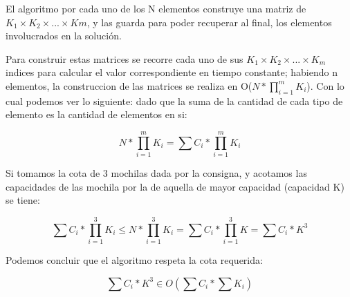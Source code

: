 El algoritmo por cada uno de los N elementos construye una matriz de $K_{1} \times K_{2} \times...\times K{m}$, y las guarda para poder recuperar al final, los elementos involucrados en la solución.

Para construir estas matrices se recorre cada uno de sus $K_{1} \times K_{2} \times...\times K_{m}$ indices para calcular el valor correspondiente en tiempo constante; habiendo n elementos, la construccion de las matrices se realiza en O($N \ast \prod_{i=1}^{m}K_{i}$). Con lo cual podemos ver lo siguiente: dado que la suma de la cantidad de cada tipo de elemento es la cantidad de elementos en si:

\[
N \ast \prod_{i=1}^{m}K_{i} = \sum C_{i} \ast \prod_{i=1}^{m}K_{i}
\]

Si tomamos la cota de 3 mochilas dada por la consigna, y acotamos las capacidades de las mochila por la de aquella de mayor capacidad (capacidad K) se tiene:

\[
\sum C_{i} \ast \prod_{i=1}^{3} K_{i} \leq
N \ast \prod_{i=1}^{3}K_{i} = \sum C_{i} \ast \prod_{i=1}^{3}K = \sum C_{i} \ast  K^{3}
\]  

Podemos concluir que el algoritmo respeta la cota requerida:


\[
\sum C_{i} \ast  K^{3} \in O( \sum C_{i} \ast \sum K_{i})
\]